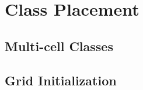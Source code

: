 \documentclass[../../main.tex]{subfiles}
\begin{document}
\section{Class Placement}

\subsection{Multi-cell Classes}
\subsection{Grid Initialization}
\end{document}
